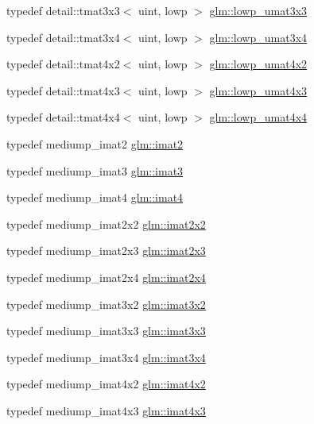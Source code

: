 \begin{CompactItemize}
\item 
typedef detail::tmat3x3$<$ uint, lowp $>$ \hyperlink{group__gtc__matrix__integer_g691694b1a4c6d1e613d8f1f707acc829}{glm::lowp\_\-umat3x3}
\item 
typedef detail::tmat3x4$<$ uint, lowp $>$ \hyperlink{group__gtc__matrix__integer_gd44577fcaebad47da39cc244566d7fe3}{glm::lowp\_\-umat3x4}
\item 
typedef detail::tmat4x2$<$ uint, lowp $>$ \hyperlink{group__gtc__matrix__integer_g7583563f93096623d54ec8fddd806d13}{glm::lowp\_\-umat4x2}
\item 
typedef detail::tmat4x3$<$ uint, lowp $>$ \hyperlink{group__gtc__matrix__integer_g03af6e7ea92be81959305fc89a239cf5}{glm::lowp\_\-umat4x3}
\item 
typedef detail::tmat4x4$<$ uint, lowp $>$ \hyperlink{group__gtc__matrix__integer_g394ee910348beffe9c7d6b694d5efe5f}{glm::lowp\_\-umat4x4}
\item 
typedef mediump\_\-imat2 \hyperlink{group__gtc__matrix__integer_g77a581b3366fb63fc72f8f20830003e0}{glm::imat2}
\item 
typedef mediump\_\-imat3 \hyperlink{group__gtc__matrix__integer_g45481922dd07a3a8e23758286311ee97}{glm::imat3}
\item 
typedef mediump\_\-imat4 \hyperlink{group__gtc__matrix__integer_g40fc5c5e0b07543497aa1c314891544a}{glm::imat4}
\item 
typedef mediump\_\-imat2x2 \hyperlink{group__gtc__matrix__integer_gf7f44f44d966377666d41ed059524732}{glm::imat2x2}
\item 
typedef mediump\_\-imat2x3 \hyperlink{group__gtc__matrix__integer_g143bc5177bac9991d84b70da03952516}{glm::imat2x3}
\item 
typedef mediump\_\-imat2x4 \hyperlink{group__gtc__matrix__integer_gfe2d058e164fd1badace451ffcf4ae46}{glm::imat2x4}
\item 
typedef mediump\_\-imat3x2 \hyperlink{group__gtc__matrix__integer_g04deef94cdfdd3b3b2706e10a32ef7f3}{glm::imat3x2}
\item 
typedef mediump\_\-imat3x3 \hyperlink{group__gtc__matrix__integer_geff9ef8f56cccc828d6b897923e75402}{glm::imat3x3}
\item 
typedef mediump\_\-imat3x4 \hyperlink{group__gtc__matrix__integer_gee5507e6cbbdd05841a0c174e60dd036}{glm::imat3x4}
\item 
typedef mediump\_\-imat4x2 \hyperlink{group__gtc__matrix__integer_g7e733984837e0e7aa9f4aac18f632f63}{glm::imat4x2}
\item 
typedef mediump\_\-imat4x3 \hyperlink{group__gtc__matrix__integer_ga4cca8e80c0603239eda452860063844}{glm::imat4x3}

\end{CompactItemize}
